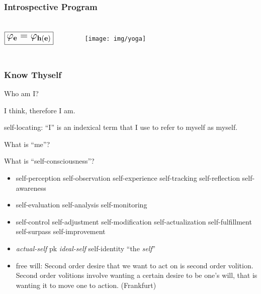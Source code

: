 \documentclass[UTF8,11pt,colorlinks,compress,openany]{beamer}%
\begin{document}
\begin{frame}\frametitle{Introspective Program}\centering
\fbox{\textcolor{green}{There is a program that is totally introspective.}}
\begin{columns}
\vspace{-7ex}
\[\fbox{\Large $\mathbf{\varphi_e=\varphi_{h(e)}}$}\]
	\begin{figure}[H]\vspace{-1ex}
		\begin{center}
			\texttt{[image: img/yoga]}
		\end{center}
	\end{figure}
\end{columns}
\end{frame}

\begin{frame}\frametitle{Know Thyself}
\centerline{\Huge Who am I?}
\centerline{I think, therefore I am.}
\centerline{self-locating: ``I'' is an indexical term that I use to refer to myself as myself.}
\centerline{What is ``me''?}
\centerline{\Large What is ``self-consciousness''?}
\begin{itemize}
	\item self-perception self-observation self-experience self-tracking self-reflection self-awareness
	\item self-evaluation self-analysis self-monitoring
	\item self-control self-adjustment self-modification self-actualization self-fulfillment self-surpass self-improvement
	\item \emph{actual-self} pk \emph{ideal-self} self-identity ``the \emph{self}''
	\item free will: Second order desire that we want to act on is second order volition. Second order volitions involve wanting a certain desire to be one's will, that is wanting it to move one to action. (Frankfurt)
\end{itemize}
\end{frame}
\end{document}
